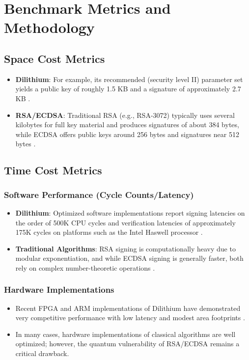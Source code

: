 \documentclass{article}
\begin{document}
\section{Benchmark Metrics and Methodology}

\subsection{Space Cost Metrics}
\begin{itemize}
    \item \textbf{Dilithium}: For example, its recommended (security level II) parameter set yields a public key of roughly 1.5 KB and a signature of approximately 2.7 KB \cite{ref0, ref4}.
    \item \textbf{RSA/ECDSA}: Traditional RSA (e.g., RSA-3072) typically uses several kilobytes for full key material and produces signatures of about 384 bytes, while ECDSA offers public keys around 256 bytes and signatures near 512 bytes \cite{ref5}.
\end{itemize}

\subsection{Time Cost Metrics}
\subsubsection{Software Performance (Cycle Counts/Latency)}
\begin{itemize}
    \item \textbf{Dilithium}: Optimized software implementations report signing latencies on the order of 500K CPU cycles and verification latencies of approximately 175K cycles on platforms such as the Intel Haswell processor \cite{ref0, ref2}.
    \item \textbf{Traditional Algorithms}: RSA signing is computationally heavy due to modular exponentiation, and while ECDSA signing is generally faster, both rely on complex number-theoretic operations \cite{ref5}.
\end{itemize}

\subsubsection{Hardware Implementations}
\begin{itemize}
    \item Recent FPGA and ARM implementations of Dilithium have demonstrated very competitive performance with low latency and modest area footprints \cite{ref2, ref6, ref8}.
    \item In many cases, hardware implementations of classical algorithms are well optimized; however, the quantum vulnerability of RSA/ECDSA remains a critical drawback.
\end{itemize}
\end{document}
